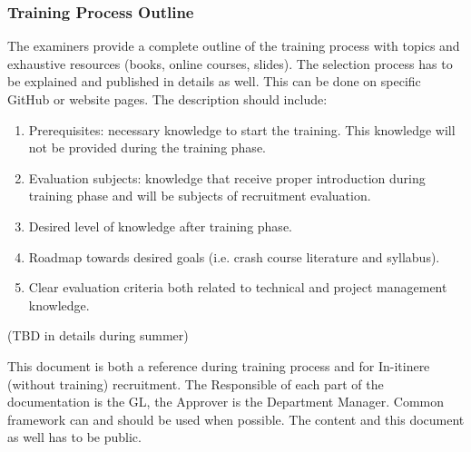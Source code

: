 \documentclass[graybox]{svmult}
\begin{document}
\subsubsection{Training Process Outline}
The examiners provide a complete outline of the training process with topics and exhaustive resources (books, online courses, slides). The selection process has to be explained and published in details as well. This can be done on specific GitHub or website pages.
The description should include:
\begin{enumerate}
\item Prerequisites: necessary knowledge to start the training. This knowledge will not be provided during the training phase.
\item Evaluation subjects: knowledge that receive proper introduction during training phase and will be subjects of recruitment evaluation.
\item Desired level of knowledge after training phase.
\item Roadmap towards desired goals (i.e. crash course literature and syllabus).
\item Clear evaluation criteria both related to technical and project management knowledge.
\end{enumerate}
(TBD in details during summer)

\par
This document is both a reference during training process and for In-itinere (without training) recruitment. The Responsible of each part of the documentation is the GL, the Approver is the Department Manager. Common framework can and should be used when possible. The content and this document as well has to be public.

%
\end{document}
